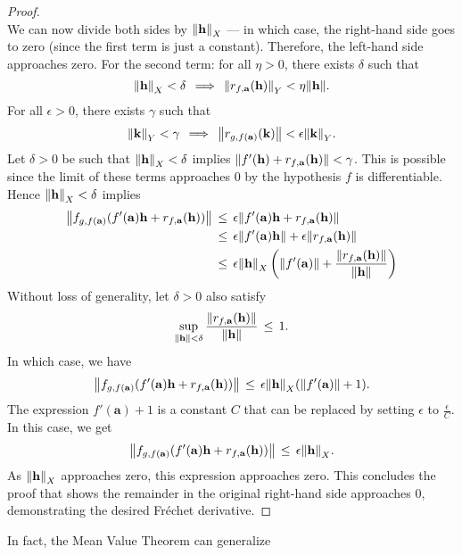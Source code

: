 \documentclass[11pt]{article}
\renewcommand{\vec}[1]{\mathbf{#1}}
\begin{document}
\begin{adjustwidth}{0.5cm}{}
\begin{proof}
\[    \]
    We can now divide both sides by $\norm{\vec{h}}_{X}$ --- in which case, the right-hand side goes to zero (since the first term is just a constant). Therefore, the left-hand side approaches zero. For the second term: for all $\eta > 0$, there exists $\delta$ such that
    \[
      \norm{\vec{h}}_{X} < \delta \, \implies \, \norm{r_{f, \vec{a}}(\vec{h})}_{Y} < \eta \norm{\vec{h}}.
    \]
    For all $\epsilon > 0$, there exists $\gamma$ such that
    \[
      \norm{\vec{k}}_{Y} < \gamma \, \implies \, \norm{r_{g, f(\vec{a})}(\vec{k})} < \epsilon \norm{\vec{k}}_{Y}.
    \]
    Let $\delta > 0$ be such that $\norm{\vec{h}}_{X} < \delta$ implies $\norm{f'(\vec{h}) + r_{f, \vec{a}}(\vec{h})} < \gamma$. This is possible since the limit of these terms approaches $0$ by the hypothesis $f$ is differentiable. Hence $\norm{\vec{h}}_{X} < \delta$ implies
    \begin{align*}
      \norm{f_{g, f(\vec{a})}(f'(\vec{a})\vec{h} + r_{f, \vec{a}}(\vec{h}))} \, &\le \, \epsilon \norm{ f'(\vec{a})\vec{h} + r_{f, \vec{a}}(\vec{h})} \\
                                                                                           & \le  \, \epsilon \norm{f'(\vec{a})\vec{h}} + \epsilon \norm{r_{f, \vec{a}}(\vec{h})} \\
                                                                                                                                                                                   & \le \, \epsilon \norm{\vec{h}}_{X} \left( \norm{f'(\vec{a})}+ \frac{\norm{r_{f, \vec{a}}(\vec{h})}}{\norm{\vec{h}}} \right)
    \end{align*}
    Without loss of generality, let $\delta > 0$ also satisfy
    \[
      \sup\limits_{\norm{\vec{h}} < \delta} \frac{\norm{r_{f, \vec{a}}(\vec{h})}}{\norm{\vec{h}}} \, \le \, 1.
    \]
    In which case, we have
    \[
      \norm{f_{g, f(\vec{a})}(f'(\vec{a})\vec{h} + r_{f, \vec{a}}(\vec{h}))} \, \le \, \epsilon \norm{\vec{h}}_{X} (\norm{f'(\vec{a})} + 1). \\
    \]
    The expression $f'(\vec{a}) + 1$ is a constant $C$ that can be replaced by setting $\epsilon$ to $\tfrac{\epsilon}{C}$. In this case, we get
    \[
      \norm{f_{g, f(\vec{a})}(f'(\vec{a})\vec{h} + r_{f, \vec{a}}(\vec{h}))} \, \le \, \epsilon \norm{\vec{h}}_{X}. \\
    \]
    As $\norm{\vec{h}}_{X}$ approaches zero, this expression approaches zero. This concludes the proof that shows the remainder in the original right-hand side approaches $0$, demonstrating the desired Fréchet derivative.
  \end{proof}
\end{adjustwidth}

In fact, the Mean Value Theorem can generalize 

\end{document}
